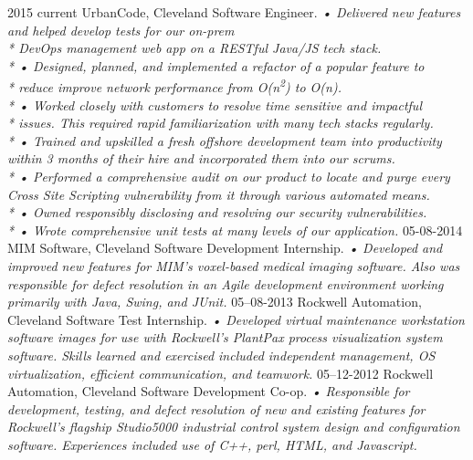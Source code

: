 \documentclass[]{friggeri-cv}
\begin{document}
\begin{entrylist}
  \entry
    {2015 current}
    {UrbanCode, Cleveland}
    {Software Engineer.}
    {\emph{
    •	Delivered new features and helped develop tests for our on-prem \\* DevOps management web app on a RESTful Java/JS tech stack.\\*
    •   Designed, planned, and implemented a refactor of a popular feature to \\* reduce improve network performance from O(n\textsuperscript{2}) to O(n).\\*
    •	Worked closely with customers to resolve time sensitive and impactful\\* issues. This required rapid familiarization with many tech stacks regularly.\\*
    •	Trained and upskilled a fresh offshore development team into productivity within 3 months of their hire and incorporated them into our scrums. \\*
    •	Performed a comprehensive audit on our product to locate and purge every Cross Site Scripting vulnerability from it through various automated means.\\*
    •	Owned responsibly disclosing and resolving our security vulnerabilities.\\*
    •	Wrote comprehensive unit tests at many levels of our application.
}}
  \entry
    {05-08-2014}
    {MIM Software, Cleveland}
    {Software Development Internship.}
    {\emph{
    •	Developed and improved new features for MIM's voxel-based medical imaging software. Also was responsible for defect resolution in an Agile development environment working primarily with Java, Swing, and JUnit.}}
  \entry
    {05–08-2013}
    {Rockwell Automation, Cleveland}
    {Software Test Internship.}
    {\emph{
    •	Developed virtual maintenance workstation software images for use with Rockwell’s PlantPax process visualization system software. Skills learned and exercised included independent management, OS virtualization, efficient communication, and teamwork.}}
  \entry
    {05–12-2012}
    {Rockwell Automation, Cleveland}
    {Software Development Co-op.}
    {\emph{
    •	Responsible for development, testing, and defect resolution of new and existing features for Rockwell’s flagship Studio5000 industrial control system design and configuration software.  Experiences included use of C++, perl, HTML, and Javascript.}}
\end{entrylist}
\end{document}
